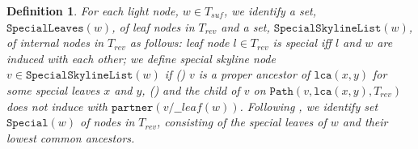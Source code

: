 \documentclass[smallabstract,smallcaptions]{dccpaper}
\newtheorem{definition}{Definition}
\def\idtt#1{\ensuremath{\mathtt{#1}}}
\def\hp\_leaf{\idtt{hp\_leaf}}
\def\partner{\idtt{partner}}
\def\path{\idtt{Path}}
\def\loci{\idtt{loci}}
\def\SpecialLeaves{\idtt{SpecialLeaves}}
\def\SpecialSkylineList{\idtt{SpecialSkylineList}}
\def\Special{\idtt{Special}}
\def\lca{\idtt{lca}}
\begin{document}

\begin{definition} %
	\label{def: special_sky}
	For each light node, $w \in T_{suf}$, we identify a set, $\SpecialLeaves(w)$, of leaf nodes in $T_{rev}$  and a set, $\SpecialSkylineList(w)$, of internal nodes in $T_{rev}$  as follows: leaf node $l\in T_{rev}$ is special iff $l$ and $w$ are induced with each other;
	we define special skyline node $v \in \SpecialSkylineList(w)$ if () $v$ is a proper ancestor of $\lca(x, y)$ for some special leaves $x$ and $y$, () and the child of $v$ on $\path(v, \lca(x, y), T_{rev})$ does not induce with $\partner(v/\hp\_leaf(w))$.
	Following \cite{abedin2018heaviest}, we identify set $\Special(w)$ of nodes in $T_{rev}$, consisting of the special leaves of $w$ and their lowest common ancestors.
\end{definition}
\end{document}
